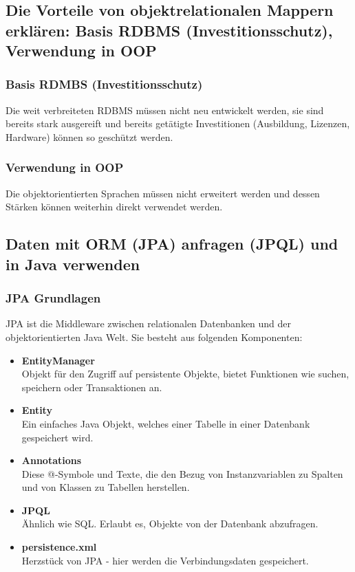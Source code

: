 \subsection{Die Vorteile von objektrelationalen Mappern erklären: Basis RDBMS (Investitionsschutz), Verwendung in OOP}
\subsubsection{Basis RDMBS (Investitionsschutz)}
Die weit verbreiteten RDBMS müssen nicht neu entwickelt werden, sie sind bereits stark ausgereift und bereits getätigte Investitionen (Ausbildung, Lizenzen, Hardware) können so geschützt werden.
\subsubsection{Verwendung in OOP}
Die objektorientierten Sprachen müssen nicht erweitert werden und dessen Stärken können weiterhin direkt verwendet werden.
\subsection{Daten mit ORM (JPA) anfragen (JPQL) und in Java verwenden}
\subsubsection{JPA Grundlagen}
JPA ist die Middleware zwischen relationalen Datenbanken und der objektorientierten Java Welt. Sie besteht aus folgenden Komponenten:
\begin{itemize}
  \item \textbf{EntityManager} \\
  Objekt für den Zugriff auf persistente Objekte, bietet Funktionen wie suchen, speichern oder Transaktionen an.
  \item \textbf{Entity} \\
  Ein einfaches Java Objekt, welches einer Tabelle in einer Datenbank gespeichert wird.
  \item \textbf{Annotations} \\
  Diese @-Symbole und Texte, die den Bezug von Instanzvariablen zu Spalten und von Klassen zu Tabellen herstellen.
  \item \textbf{JPQL}  \\
    Ähnlich wie SQL. Erlaubt es, Objekte von der Datenbank abzufragen.
    \item \textbf{persistence.xml} \\
    Herzstück von JPA - hier werden die Verbindungsdaten gespeichert.
\end{itemize}

